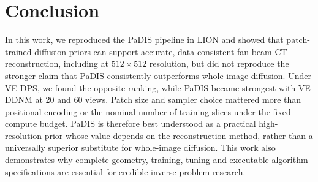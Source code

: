 \ifpdf
    \graphicspath{{Sections/6_conclusions_figs/Raster/}{Sections/6_conclusions_figs/PDF/}{Sections/6_conclusions_figs/}}
\else
    \graphicspath{{Sections/6_conclusions_figs/Vector/}{Sections/6_conclusions_figs/}}
\fi

\chapter{Conclusion}
\label{sec:conclusion}

In this work, we reproduced the PaDIS pipeline in LION and showed that patch-trained diffusion priors can support accurate, data-consistent fan-beam CT reconstruction, including at $512\times512$ resolution, but did not reproduce the stronger claim that PaDIS consistently outperforms whole-image diffusion. Under VE-DPS, we found the opposite ranking, while PaDIS became strongest with VE-DDNM at 20 and 60 views. Patch size and sampler choice mattered more than positional encoding or the nominal number of training slices under the fixed compute budget. PaDIS is therefore best understood as a practical high-resolution prior whose value depends on the reconstruction method, rather than a universally superior substitute for whole-image diffusion. This work also demonstrates why complete geometry, training, tuning and executable algorithm specifications are essential for credible inverse-problem research.

